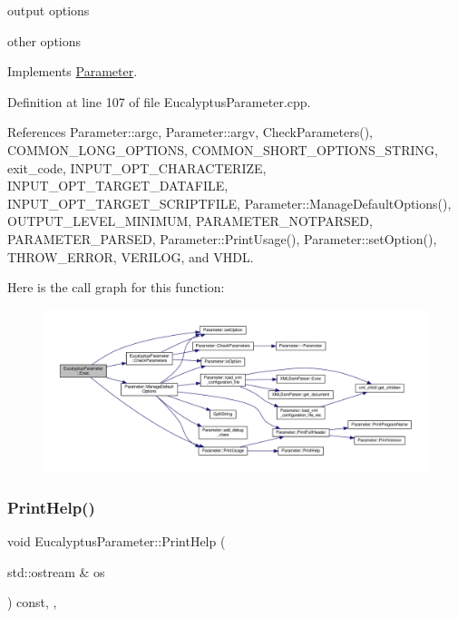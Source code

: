 output options

other options 

Implements \hyperlink{classParameter_a9f5cc51b6e9ac1e01fe1c5a6362c030b}{Parameter}.



Definition at line 107 of file Eucalyptus\+Parameter.\+cpp.



References Parameter\+::argc, Parameter\+::argv, Check\+Parameters(), C\+O\+M\+M\+O\+N\+\_\+\+L\+O\+N\+G\+\_\+\+O\+P\+T\+I\+O\+NS, C\+O\+M\+M\+O\+N\+\_\+\+S\+H\+O\+R\+T\+\_\+\+O\+P\+T\+I\+O\+N\+S\+\_\+\+S\+T\+R\+I\+NG, exit\+\_\+code, I\+N\+P\+U\+T\+\_\+\+O\+P\+T\+\_\+\+C\+H\+A\+R\+A\+C\+T\+E\+R\+I\+ZE, I\+N\+P\+U\+T\+\_\+\+O\+P\+T\+\_\+\+T\+A\+R\+G\+E\+T\+\_\+\+D\+A\+T\+A\+F\+I\+LE, I\+N\+P\+U\+T\+\_\+\+O\+P\+T\+\_\+\+T\+A\+R\+G\+E\+T\+\_\+\+S\+C\+R\+I\+P\+T\+F\+I\+LE, Parameter\+::\+Manage\+Default\+Options(), O\+U\+T\+P\+U\+T\+\_\+\+L\+E\+V\+E\+L\+\_\+\+M\+I\+N\+I\+M\+UM, P\+A\+R\+A\+M\+E\+T\+E\+R\+\_\+\+N\+O\+T\+P\+A\+R\+S\+ED, P\+A\+R\+A\+M\+E\+T\+E\+R\+\_\+\+P\+A\+R\+S\+ED, Parameter\+::\+Print\+Usage(), Parameter\+::set\+Option(), T\+H\+R\+O\+W\+\_\+\+E\+R\+R\+OR, V\+E\+R\+I\+L\+OG, and V\+H\+DL.

Here is the call graph for this function\+:
\nopagebreak
\begin{figure}[H]
\begin{center}
\leavevmode
\includegraphics[width=350pt]{d0/d5b/classEucalyptusParameter_ac4a336c1c386a2cbd9adc9dfb637b04b_cgraph}
\end{center}
\end{figure}
\mbox{\label{classEucalyptusParameter_a420b6819e64f1d3dcc1be2efeeb91467}} 
\subsubsection{\texorpdfstring{Print\+Help()}{PrintHelp()}}
{\footnotesize\ttfamily void Eucalyptus\+Parameter\+::\+Print\+Help (\begin{DoxyParamCaption}\item[{std\+::ostream \&}]{os }\end{DoxyParamCaption}) const\hspace{0.3cm}{\ttfamily [override]}, {\ttfamily [private]}, {\ttfamily [virtual]}}



